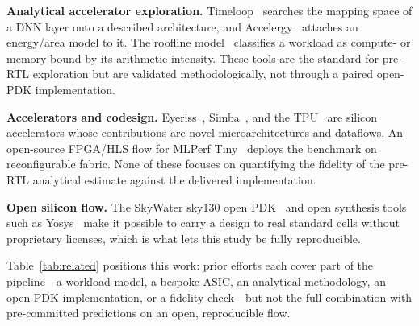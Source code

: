\documentclass[conference]{IEEEtran}
\begin{document}
\textbf{Analytical accelerator exploration.} Timeloop~\cite{timeloop} searches
the mapping space of a DNN layer onto a described architecture, and
Accelergy~\cite{accelergy} attaches an energy/area model to it. The roofline
model~\cite{roofline} classifies a workload as compute- or memory-bound by its
arithmetic intensity. These tools are the standard for pre-RTL exploration but
are validated methodologically, not through a paired open-PDK implementation.

\textbf{Accelerators and codesign.} Eyeriss~\cite{eyeriss},
Simba~\cite{simba}, and the TPU~\cite{tpu} are silicon accelerators whose
contributions are novel microarchitectures and dataflows. An open-source
FPGA/HLS flow for MLPerf Tiny~\cite{fpgacodesign} deploys the benchmark on
reconfigurable fabric. None of these focuses on quantifying the fidelity of the
pre-RTL analytical estimate against the delivered implementation.

\textbf{Open silicon flow.} The SkyWater sky130 open PDK~\cite{sky130} and
open synthesis tools such as Yosys~\cite{yosys} make it possible to carry a
design to real standard cells without proprietary licenses, which is what lets
this study be fully reproducible.

Table~\ref{tab:related} positions this work: prior efforts each cover part of
the pipeline---a workload model, a bespoke ASIC, an analytical methodology, an
open-PDK implementation, or a fidelity check---but not the full combination with
pre-committed predictions on an open, reproducible flow.

\begin{table}[t]
\caption{Capability coverage of representative prior work vs. this study.}
\label{tab:related}
\centering\footnotesize
\setlength{\tabcolsep}{3pt}
\end{table}
\end{document}

